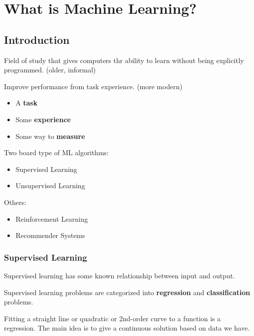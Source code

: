 \documentclass[en,11pt,english,black,simple]{../elegantbook}
\begin{document}
\fi 
\def\chapname{01whatisml}

    

\chapter{What is Machine Learning?}

\section{Introduction}

\begin{definition}
    Field of study that gives computers thr ability to learn without being explicitly programmed.  (older, informal)

    Improve performance from task experience. (more modern)
    \begin{itemize}
        \item A \textbf{task}
        \item Some \textbf{experience}
        \item Some way to \textbf{measure}
    \end{itemize}
\end{definition}



Two board type of ML algorithms:
\begin{itemize}
    
    \item Supervised Learning
    \item Unsupervised Learning
    
\end{itemize}

Others: 
\begin{itemize}
    \item Reinforcement Learning
    \item Recommender Systems
\end{itemize}

\subsection{Supervised Learning} 

Supervised learning has some known relationship between input and output.

Supervised learning problems are categorized into \textbf{regression} and \textbf{classification} problems.

Fitting a straight line or quadratic or 2nd-order curve to a function is a regression. The main idea is to give a continuous solution based on data we have.
\end{document}
